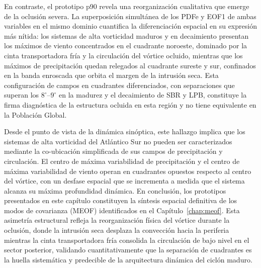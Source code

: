 En contraste, el prototipo p90 revela una reorganización cualitativa que emerge de la oclusión severa. La superposición simultánea de los PDFe y EOF1 de ambas variables en el mismo dominio cuantifica la diferenciación espacial en su expresión más nítida: los sistemas de alta vorticidad maduros y en decaimiento presentan los máximos de viento concentrados en el cuadrante noroeste, dominado por la cinta transportadora fría y la circulación del vórtice ocluido, mientras que los máximos de precipitación quedan relegados al cuadrante sureste y sur, confinados en la banda enroscada que orbita el margen de la intrusión seca. Esta configuración de campos en cuadrantes diferenciados, con separaciones que superan los $8^{\circ}$--$9^{\circ}$ en la madurez y el decaimiento de SBR y LPB, constituye la firma diagnóstica de la estructura ocluida en esta región y no tiene equivalente en la Población Global.

Desde el punto de vista de la dinámica sinóptica, este hallazgo implica que los sistemas de alta vorticidad del Atlántico Sur no pueden ser caracterizados mediante la co-ubicación simplificada de sus campos de precipitación y circulación.
El centro de máxima variabilidad de precipitación y el centro de máxima variabilidad de viento operan en cuadrantes opuestos respecto al centro del vórtice, con un desfase espacial que se incrementa a medida que el sistema alcanza su máxima profundidad dinámica.
En conclusión, los prototipos presentados en este capítulo constituyen la síntesis espacial definitiva de los modos de covarianza (MEOF) identificados en el Capítulo~\ref{chap:meof}. Esta asimetría estructural refleja la reorganización física del vórtice durante la oclusión, donde la intrusión seca desplaza la convección hacia la periferia mientras la cinta transportadora fría consolida la circulación de bajo nivel en el sector posterior, validando cuantitativamente que la separación de cuadrantes es la huella sistemática y predecible de la arquitectura dinámica del ciclón maduro.
